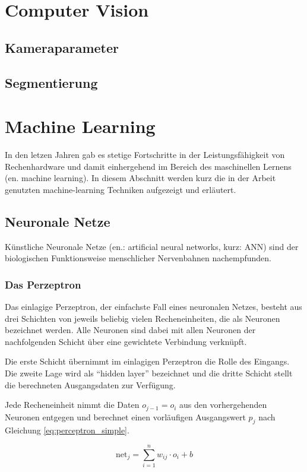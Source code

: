 \section { Computer Vision }
	\subsection { Kameraparameter }
	\subsection { Segmentierung }
		

	
\section { Machine Learning }
	In den letzen Jahren gab es stetige Fortschritte in der Leistungsfähigkeit von Rechenhardware und damit einhergehend im Bereich des maschinellen Lernens (en. machine learning).
	In diesem Abschnitt werden kurz die in der Arbeit genutzten machine-learning Techniken aufgezeigt und erläutert.
	
	\subsection { Neuronale Netze }
	Künstliche Neuronale Netze (en.: artificial neural networks, kurz: ANN) sind der biologischen Funktionsweise menschlicher Nervenbahnen nachempfunden. 
	
		\subsubsection { Das Perzeptron }
		Das einlagige Perzeptron, der einfachste Fall eines neuronalen Netzes, besteht aus drei Schichten von jeweils beliebig vielen Recheneinheiten, die als Neuronen bezeichnet werden. Alle Neuronen sind dabei mit allen Neuronen der nachfolgenden Schicht über eine gewichtete Verbindung verknüpft. 
		
		Die erste Schicht übernimmt im einlagigen Perzeptron die Rolle des Eingangs. Die zweite Lage wird als "`hidden layer"' bezeichnet und die dritte Schicht stellt die berechneten Ausgangsdaten zur Verfügung.
		
		Jede Recheneinheit nimmt die Daten $o_{j-1} = o_i$ aus den vorhergehenden Neuronen entgegen und berechnet einen vorläufigen Ausgangswert $p_j$ nach Gleichung \ref{eq:perceptron_simple}. 
		
		\begin{equation}
			\label{eq:perceptron_simple}
			\text{net}_j = \sum_{i=1}^{n} w_{ij} \cdot o_i + b
		\end{equation}
		
